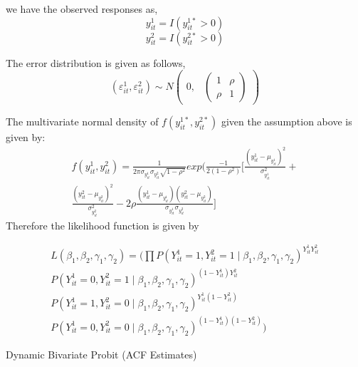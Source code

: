 \documentclass[12pt]{article}
\begin{document}
we have the observed responses as, 
$$y_{it}^{1}= I(y^{1*}_{it}>0)$$
$$y_{it}^{2}= I(y^{2*}_{it}>0)$$

The error distribution is given as follows,
$$(\varepsilon_{it}^{1}, \varepsilon_{it}^{2}) \sim N \begin{pmatrix} 0, & \begin{pmatrix}1 & \rho\\ \rho & 1\end{pmatrix} 
\end{pmatrix}$$

The multivariate normal density  of $f(y^{1*}_{it}, y^{2*}_{it})$  given the assumption above is given by: 
\begin{equation}
\begin{aligned}
    f(y_{it}^{1},y_{it}^{2}) = \frac{1}{2\pi \sigma_{y_{it}^{1}}\sigma_{y_{it}^{2}}\sqrt{1-\rho^2}} exp(\frac{-1}{2(1-\rho^2)} [\frac{(y_{it}^{1} - \mu_{y_{it}^{1}})^2}{\sigma_{y_{it}^{1}}^{2}} + \\
    \frac{(y_{it}^{2} - \mu_{y_{it}^{2}})^2}{\sigma_{y_{it}^{2}}^{2}} 
    -2 \rho \frac{(y_{it}^{1} - \mu_{y_{it}^{1}}) (y_{it}^{2} - \mu_{y_{it}^{2}})
    }{\sigma_{y_{it}^{1}}\sigma_{y_{it}^{2}}}]
  \end{aligned}
\end{equation}
Therefore the likelihood function is given by 

\begin{equation}
\begin{aligned}
L(\beta_1,\beta_2,\gamma_1,\gamma_2) = \Big( \prod
P(Y_{it}^{1}=1,Y_{it}^{2}=1\mid\beta_1,\beta_2,\gamma_1,\gamma_2)^{Y_{it}^{1}Y_{it}^{2}}\\
 P(Y_{it}^{1}=0,Y_{it}^{2}=1\mid\beta_1,\beta_2,\gamma_1,\gamma_2)^{(1-Y_{it}^{1})Y_{it}^{2}}  \\
P(Y_{it}^{1}=1,Y_{it}^{2}=0\mid\beta_1,\beta_2,\gamma_1,\gamma_2)^{Y_{it}^{1}(1-Y_{it}^{2})}\\
P(Y_{it}^{1}=0,Y_{it}^{2}=0\mid\beta_1,\beta_2,\gamma_1,\gamma_2)^{(1-Y_{it}^{1})(1-Y_{it}^{2})} \Big)
\end{aligned}
\end{equation}




\begin{center}
\begin{table}[H]
\caption{Dynamic Bivariate Probit (ACF Estimates)}
\label{tab:biprobitacf}

\end{table}
\end{center} 
\end{document}
